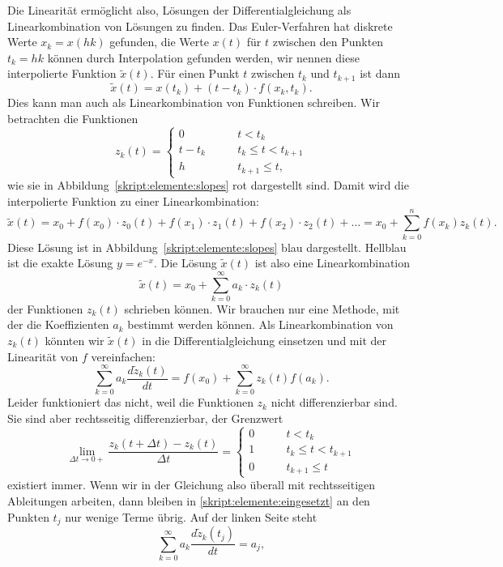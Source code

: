Die Linearität ermöglicht also, Lösungen der Differentialgleichung
als Linearkombination von Lösungen zu finden.
Das Euler-Verfahren hat diskrete Werte $x_k=x(hk)$ gefunden,
die Werte $x(t)$ für $t$ zwischen den Punkten $t_k=hk$ können
durch Interpolation gefunden werden, wir nennen diese interpolierte
Funktion $\tilde{x}(t)$.
Für einen Punkt $t$ zwischen $t_k$ und $t_{k+1}$ ist dann
\[
\tilde{x}(t) = x(t_k) + (t-t_k)\cdot f(x_k, t_k).
\]
Dies kann man auch als Linearkombination von Funktionen
schreiben.
Wir betrachten die Funktionen
\[
z_k(t)
=
\begin{cases}
0&\qquad t < t_k\\
t-t_k&\qquad t_k \le t < t_{k+1}\\
h&\qquad t_{k+1} \le t,
\end{cases}
\]
wie sie in Abbildung~\ref{skript:elemente:slopes} rot dargestellt sind.
Damit wird die interpolierte Funktion zu einer Linearkombination:
\[
\tilde{x}(t)
=
x_0 + f(x_0)\cdot z_0(t) + f(x_1)\cdot z_1(t) + f(x_2) \cdot z_2(t) + \dots
=
x_0
+
\sum_{k=0}^n f(x_k) z_k(t).
\]
Diese Lösung ist in Abbildung~\ref{skript:elemente:slopes} blau dargestellt.
Hellblau ist die exakte Lösung $y=e^{-x}$.
Die Lösung $\tilde{x}(t)$ ist also eine Linearkombination
\[
\tilde x(t) = x_0 + \sum_{k=0}^\infty a_k\cdot z_k(t)
\]
der Funktionen $z_k(t)$ schrieben können.
Wir brauchen nur eine Methode, mit der die Koeffizienten $a_k$ bestimmt
werden können.
Als Linearkombination von $z_k(t)$ könnten wir $\tilde{x}(t)$ in die 
Differentialgleichung einsetzen und mit der Linearität von $f$ vereinfachen:
\begin{equation}
\sum_{k=0}^\infty
a_k\frac{d\tilde{z}_k(t)}{dt}
=
f(x_0) + \sum_{k=0}^\infty z_k(t) f(a_k).
\label{skript:elemente:eingesetzt}
\end{equation}
Leider funktioniert das nicht, weil die Funktionen $z_k$ nicht differenzierbar
sind.
Sie sind aber rechts\-seitig differenzierbar, der Grenzwert
\[
\lim_{\Delta t \to 0+} \frac{z_k(t+\Delta t)-z_k(t)}{\Delta t}
=
\begin{cases}
0&\qquad t<t_k\\
1&\qquad t_k\le t< t_{k+1}\\
0&\qquad t_{k+1} \le t
\end{cases}
\]
existiert immer.
Wenn wir in der Gleichung also überall mit rechtsseitigen Ableitungen
arbeiten, dann bleiben in \eqref{skript:elemente:eingesetzt} an den
Punkten $t_j$ nur wenige Terme übrig.
Auf der linken Seite steht
\begin{equation}
\sum_{k=0}^\infty
a_k\frac{d\tilde{z}_k(t_j)}{dt}
=
a_j,
\label{skript:elemente:links}
\end{equation}
